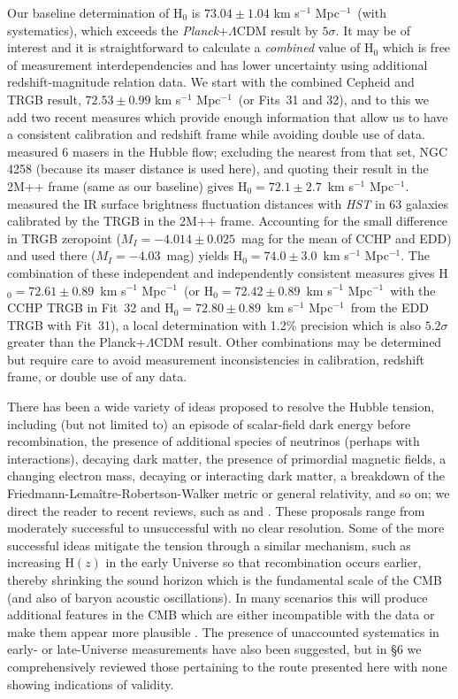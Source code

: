 \documentclass[12pt]{aastex631}
\newcommand{\kms}{km s$^{-1}$ Mpc$^{-1}$}
\newcommand{\kmss }{km s$^{-1}$ Mpc$^{-1}$\ }
\newcommand{\hsbase}{$ 73.04 \pm  1.04  $ km s$^{-1}$ Mpc$^{-1}$}
\newcommand{\hswtrgbmean}{$ 72.53 \pm 0.99 $ km s$^{-1}$ Mpc$^{-1}$}
\begin{document}
Our baseline determination of H$_0$ is \hsbase\ (with systematics), which exceeds the {\it Planck}$+\Lambda$CDM result by $5\sigma$. It may be of interest and it is straightforward to calculate a {\it combined} value of H$_0$ which is free of measurement interdependencies and has lower uncertainty using additional redshift-magnitude relation data.  We start with the combined Cepheid and TRGB result, \hswtrgbmean\ (or Fits~31 and 32), and to this we add two recent measures which provide enough information that allow us to have a consistent calibration and redshift frame while avoiding double use of data.  \citet{Pesce:2020} measured 6 masers in the Hubble flow; excluding the nearest from that set, NGC$\,$4258 (because its maser distance is used here), and quoting their result in the 2M++ frame (same as our baseline) gives H$_0 = 72.1 \pm 2.7$~\kms.  \citet{Blakeslee:2021} measured the IR surface brightness fluctuation distances with {\it HST} in 63 galaxies calibrated by the TRGB in the 2M++ frame.  Accounting for the small difference in TRGB zeropoint ($M_I=-4.014 \pm 0.025$~mag for the mean of CCHP and EDD) and used there ($M_I=-4.03$~mag) yields H$_0= 74.0 \pm 3.0$~\kms.  The combination of these independent and independently consistent measures gives H$_0= 72.61 \pm 0.89$~\kmss (or H$_0= 72.42 \pm 0.89$~\kmss with the CCHP TRGB in Fit~32 and H$_0= 72.80 \pm 0.89$~\kmss from the EDD TRGB with Fit~31), a local determination with 1.2\% precision which is also $5.2\sigma$ greater than the Planck+$\Lambda$CDM result.  Other combinations may be determined but require care to avoid measurement inconsistencies in calibration, redshift frame, or double use of any data.  
     
There has been a wide variety of ideas proposed to resolve the Hubble tension, including (but not limited to) an episode of scalar-field dark energy before recombination, the presence of additional species of neutrinos (perhaps with interactions), decaying dark matter, the presence of primordial magnetic fields, a changing electron mass, decaying or interacting dark matter, a breakdown of the Friedmann-Lema\^{i}tre-Robertson-Walker metric or general relativity, and so on; we direct the reader to recent reviews, such as \citet{Divalentino:2021} and \citet{Olympics:2021}.  These proposals range from moderately successful to unsuccessful with no clear resolution.  Some of the more successful ideas mitigate the tension through a similar mechanism, such as increasing H$(z)$ in the early Universe so that recombination occurs earlier, thereby shrinking the sound horizon which is the fundamental scale of the CMB (and also of baryon acoustic oscillations).  In many scenarios this will produce additional features in the CMB which are either incompatible with the data or make them appear more plausible \citep{Hill:2021,Poulin:2021}. The presence of unaccounted systematics in early- or late-Universe measurements have also been suggested, but in \S6 we comprehensively reviewed those pertaining to the route presented here with none showing indications of validity.
\end{document}
